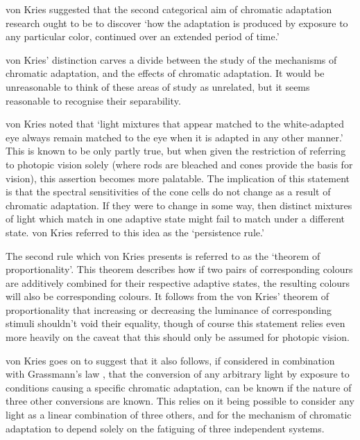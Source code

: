 von Kries suggested that the second categorical aim of chromatic adaptation research ought to be to discover `how the adaptation is produced by exposure to any particular color, continued over an extended period of time.' 

von Kries' distinction carves a divide between the study of the mechanisms of chromatic adaptation, and the effects of chromatic adaptation. It would be unreasonable to think of these areas of study as unrelated, but it seems reasonable to recognise their separability. 


von Kries noted that `light mixtures that appear matched to the white-adapted eye always remain matched to the eye when it is adapted in any other manner.' This is known to be only partly true, but when given the restriction of referring to photopic vision solely (where rods are bleached and cones provide the basis for vision), this assertion becomes more palatable. The implication of this statement is that the spectral sensitivities of the cone cells do not change as a result of chromatic adaptation. If they were to change in some way, then distinct mixtures of light which match in one adaptive state might fail to match under a different state. von Kries referred to this idea as the `persistence rule.'

The second rule which von Kries presents is referred to as the `theorem of proportionality'. This theorem describes how if two pairs of corresponding colours are additively combined for their respective adaptive states, the resulting colours will also be corresponding colours. It follows from the von Kries' theorem of proportionality that increasing or decreasing the luminance of corresponding stimuli shouldn't void their equality, though of course this statement relies even more heavily on the caveat that this should only be assumed for photopic vision.

von Kries goes on to suggest that it also follows, if considered in combination with Grassmann's law \citep{grassmann_zur_1853}, that the conversion of any arbitrary light by exposure to conditions causing a specific chromatic adaptation, can be known if the nature of three other conversions are known. This relies on it being possible to consider any light as a linear combination of three others, and for the mechanism of chromatic adaptation to depend solely on the fatiguing of three independent systems.

